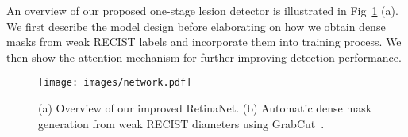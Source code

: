 \documentclass[runningheads,a4paper]{llncs}
\begin{document}
\begin{comment}
Random thoughts: Our motivation with this paper was to explore RetinaNet, a new architecture that has shown great promise for object detection, so we wanted to understand how well that would work on the Deep Lesion dataset where mostly Faster-RCNN variants have been applied to. We found RetinaNet with simple optimisations can already outperform the best reported results. Great! But the DeepLesion dataset actually contains unused information, diameters of lesions, that we can exploit. We use them to generate dense labels via grab-cut, which further improves results and is a nice finding with implications to similar problems. There is probably plenty of clinical data available with diameters annotated due to the use of RECIST.
Further improvements are obtained with data augmentation and a recently proposed attention mechanism.

\begin{itemize}
    \item explore RetinaNet for CT lesion detection
    \item model adjustments (hyperparameters and FPN optimisation) already beats state-of-the-art
    \item better use of available information: weak labels turned into dence classification
    \item also data augmentation and recently proposed attention further improves results
\end{itemize}
\end{comment}



An overview of our proposed one-stage lesion detector is illustrated in Fig~\ref{fig:network} (a). We first describe the model design before elaborating on how we obtain dense masks from weak RECIST labels and incorporate them into training process. We then show the attention mechanism for further improving detection performance.

\begin{figure}[t]
    \centering
    \texttt{[image: images/network.pdf]}
    \vspace{-2mm}
    \caption{(a) Overview of our improved RetinaNet. (b) Automatic dense mask generation from weak RECIST diameters using GrabCut~\cite{rother2004grabcut}.}
    \vspace{-6mm}
    \label{fig:network}
\end{figure}

\vspace{-3mm}
\end{document}
